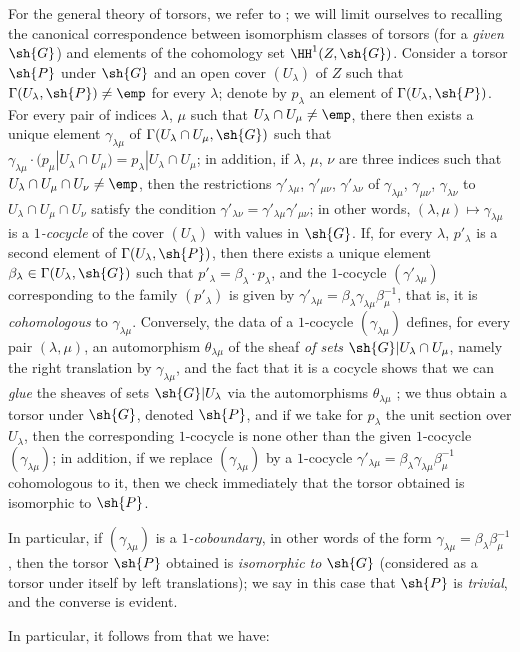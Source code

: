\begin{env}[16.5.15]
For the general theory of torsors, we refer to \cite{IV-42};
we will limit ourselves to recalling the canonical correspondence between isomorphism classes of torsors (for a \emph{given} $\sh{G}$) and elements of the cohomology set $\HH^1(Z, \sh{G})$.
Consider a torsor $\sh{P}$ under $\sh{G}$ and an open cover $(U_\lambda)$ of $Z$ such that $\Gamma(U_\lambda, \sh{P}) \neq \emp$ for every $\lambda$;
denote by $p_\lambda$ an element of $\Gamma(U_\lambda, \sh{P})$.
For every pair of indices $\lambda$, $\mu$ such that $U_\lambda \cap U_\mu \neq \emp$, there then exists a unique element $\gamma_{\lambda\mu}$ of $\Gamma(U_\lambda \cap U_\mu, \sh{G})$ such that $\gamma_{\lambda\mu} \cdot (p_\mu|U_\lambda \cap U_\mu) = p_\lambda|U_\lambda \cap U_\mu$;
in addition, if $\lambda$, $\mu$, $\nu$ are three indices such that $U_\lambda \cap U_\mu \cap U_\nu \neq \emp$, then the restrictions $\gamma'_{\lambda\mu}$, $\gamma'_{\mu\nu}$, $\gamma'_{\lambda\nu}$ of $\gamma_{\lambda\mu}$, $\gamma_{\mu\nu}$, $\gamma_{\lambda\nu}$ to $U_\lambda \cap U_\mu \cap U_\nu$ satisfy the condition $\gamma'_{\lambda\nu} = \gamma'_{\lambda\mu} \gamma'_{\mu\nu}$;
in other words, $(\lambda, \mu) \mapsto \gamma_{\lambda\mu}$ is a \emph{$1$-cocycle} of the cover $(U_\lambda)$ with values in $\sh{G}$.
If, for every $\lambda$, $p'_\lambda$ is a second element of $\Gamma(U_\lambda, \sh{P})$, then there exists a unique element $\beta_\lambda \in \Gamma(U_\lambda, \sh{G})$ such that $p'_\lambda = \beta_\lambda \cdot p_\lambda$, and the $1$-cocycle $(\gamma'_{\lambda\mu})$ corresponding to the family $(p'_\lambda)$ is given by $\gamma'_{\lambda\mu} = \beta_\lambda \gamma_{\lambda\mu} \beta_\mu^{-1}$, that is, it is \emph{cohomologous} to $\gamma_{\lambda\mu}$.
Conversely, the data of a $1$-cocycle $(\gamma_{\lambda\mu})$ defines, for every pair $(\lambda, \mu)$, an automorphism $\theta_{\lambda\mu}$ of the sheaf \emph{of sets} $\sh{G}|U_\lambda \cap U_\mu$, namely the right translation by $\gamma_{\lambda\mu}$, and the fact that it is a cocycle shows that we can \emph{glue} the sheaves of sets $\sh{G}|U_\lambda$ via the automorphisms $\theta_{\lambda\mu}$ ;
we thus obtain a torsor under $\sh{G}$, denoted $\sh{P}$, and if we take for $p_\lambda$ the unit section over $U_\lambda$, then the corresponding $1$-cocycle is none other than the given $1$-cocycle $(\gamma_{\lambda\mu})$;
in addition, if we replace $(\gamma_{\lambda\mu})$ by a $1$-cocycle $\gamma'_{\lambda\mu} = \beta_\lambda \gamma_{\lambda\mu} \beta_\mu^{-1}$ cohomologous to it, then we check immediately that the torsor obtained is isomorphic to $\sh{P}$.

In particular, if $(\gamma_{\lambda\mu})$ is a \emph{$1$-coboundary}, in other words of the form $\gamma_{\lambda\mu} = \beta_\lambda \beta_\mu^{-1}$, then the torsor $\sh{P}$ obtained is \emph{isomorphic to $\sh{G}$} (considered as a torsor under itself by left translations);
we say in this case that $\sh{P}$ is \emph{trivial}, and the converse is evident.

In particular, it follows from  that we have:
\end{env}

